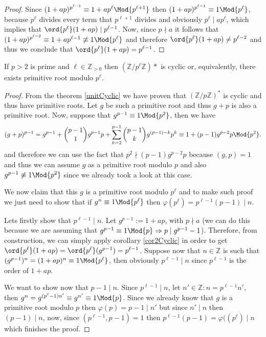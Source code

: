 \begin{proof}
   Since \((1+ap)^{p^{\ell-1}} \equiv 1 + ap^{\ell} \Mod{p^{\ell+1}}\) then \((1
   + ap)^{p^{\ell-1}} \equiv 1 \Mod{p^\ell}\), because \(p^\ell\) divides every
   term that \(p^{\ell+1}\) divides and obviously \(p^{\ell} \mid ap^\ell\),
   which implies that \(\ord{p^\ell}(1 + ap) \mid p^{\ell-1}\). Now, since \(p
   \nmid a\) it follows that \((1+ap)^{p^{\ell-2}} \equiv 1+ap^{\ell-1}
   \not\equiv 1 \Mod{p^\ell}\) and therefore \(\ord{p^\ell}(1 + ap) \neq
   p^{\ell-2}\) and thus we conclude that \(\ord{p^\ell} (1+ap) = p^{\ell-1}\).
\end{proof}

\begin{theorem}
   If \(p > 2\) is prime and  \(\ell \in \mathbb{Z}_{>0}\) then
   \((\mathbb{Z}/p^\ell\mathbb{Z})\ast\) is cyclic or, equivalently, there exists
   primitive root modulo \(p^\ell\).
\end{theorem}

\begin{proof}
   From the theorem \ref{unitCyclic} we have proven that
   \((\mathbb{Z}/p\mathbb{Z})^\ast\) is cyclic and thus have primitive roots.
   Let \(g\) be such a primitive root and thus \(g + p\) is also a primitive
   root. 
   Now, suppose that \(g^{p-1} \equiv 1 \Mod{p^2}\), then we have 
   \[
      (g + p)^{p-1} = g^{p-1} + \binom{p-1}{1} g^{p-1}p + \sum_{k=2}^{p-1}
      \binom{p-1}{k} g^{(p-1)-k}p^k
      \equiv 1 + (p-1) g^{p-2}p \Mod{p^2}.
   \]
   and therefore we can use the fact that \(p^2 \nmid (p-1) g^{p-2} p\) because
   \((g, p) = 1\) and thus we can assume \(g\) as a primitive root modulo \(p\)
   and also  \(g^{p-1} \not\equiv 1 \Mod{p^2}\) since we already took a look at
   this case.

   We now claim that this \(g\) is a primitive root modulo \(p^\ell\) and to
   make such proof we just need to show that if \(g^n \equiv 1 \Mod{p^\ell}\) then
   \(\varphi(p^\ell) = p^{\ell-1}(p-1) \mid n\).

   Lets firstly show that \(p^{\ell-1} \mid n\). Let \(g^{p-1} := 1 + ap\), with
   \(p \nmid a\) (we can do this because we are assuming that \(g^{p-1} \equiv 1
   \Mod{p} \Rightarrow p \mid g^{p-1} - 1\)). Therefore, from construction, we
   can simply apply corollary \ref{cor2Cyclic} in order to get
   \(\ord{p^\ell}(1+ap) = \ord{p^\ell}(g^{p-1}) = p^{\ell-1}\). Suppose now that
   \(n \in \mathbb{Z}\) is such that \((g^{p-1})^n = (1+ap)^n \equiv 1
   \Mod{p^\ell}\), then obviously \(p^{\ell-1} \mid n\) since \(p^{\ell-1}\) is
   the order of \(1+ap\).

   We want to show now that \(p-1 \mid n\). Since  \(p^{\ell-1} \mid n\), let
   \(n' \in \mathbb{Z} : n = p^{\ell-1} n'\), then \(g^n = g^{(p^\ell-1)n'}
   \equiv g^{n'} \equiv 1 \Mod{p}\). Since we already know that \(g\) is a
   primitive root modulo \(p\) then \(\varphi(p) = p-1 \mid n'\) but since  \(n'
   \mid n\) then \((p-1) \mid n\), now, since \((p^{\ell-1}, p-1) = 1\) then
   \(p^{\ell-1}(p-1) = \varphi((p^\ell) \mid n\) which finishes the proof.
\end{proof}

